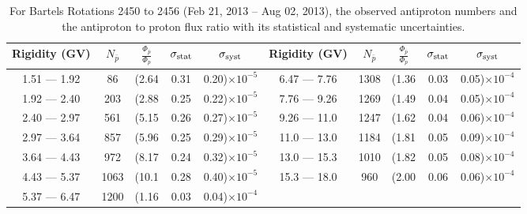 \begin{table}[p] 
\renewcommand\baselinestretch{1.3}\selectfont
\setlength\tabcolsep{3pt}
\centering
\begin{tabular}{ccccc | ccccc}
\hline
\textbf{Rigidity}  (GV)  & $N_{\bar{p}}$ & $\frac{\Phi_{\bar{p}}}{\Phi_{p}}$ & $\sigma_{\rm{stat}}$ & $\sigma_{\rm{syst}}$ \hspace{1cm}   & \textbf{Rigidity}  (GV)  & $N_{\bar{p}}$ & $\frac{\Phi_{\bar{p}}}{\Phi_{p}}$ & $\sigma_{\rm{stat}}$ & $\sigma_{\rm{syst}}$ \hspace{1cm} \\ 
\hline
1.51 — 1.92   &  86                  &(2.64                          &  0.31              &      0.20)$\times 10^{-5}$  & 6.47 — 7.76                &  1308                   &(1.36                                &  0.03                   &      0.05)$\times 10^{-4}$\\
1.92 — 2.40   &  203                &(2.88                          &  0.25              &      0.22)$\times 10^{-5}$  & 7.76 — 9.26                &  1269                    &(1.49                                &  0.04                  &      0.05)$\times 10^{-4}$\\
2.40 — 2.97   &  561                &(5.15                          &  0.26              &      0.27)$\times 10^{-5}$  & 9.26 — 11.0                &  1247                    &(1.62                                &  0.04                   &      0.06)$\times 10^{-4}$\\    
2.97 — 3.64   &  857                &(5.96                          &  0.25              &      0.29)$\times 10^{-5}$  & 11.0 — 13.0                 &  1184                    &(1.81                                &  0.05                   &      0.09)$\times 10^{-4}$\\    
3.64 — 4.43   &  972                &(8.17                          &  0.24              &      0.32)$\times 10^{-5}$  & 13.0 — 15.3               &  1010                    &(1.82                                &  0.05                   &      0.08)$\times 10^{-4}$\\
4.43 — 5.37   &  1063              &(10.1                          &  0.28              &      0.40)$\times 10^{-5}$  & 15.3 — 18.0               &  960                      &(2.00                                &  0.06                   &      0.06)$\times 10^{-4}$\\
5.37 — 6.47   &  1200              &(1.16                          &  0.03              &      0.04)$\times 10^{-4}$  & \\
\hline
\end{tabular}
\caption[Antiproton to proton flux ratio for Bartels Rotations 2450 to 2456]{For Bartels Rotations 2450 to 2456 (Feb 21, 2013 – Aug 02, 2013), the observed antiproton numbers and the antiproton to proton flux ratio with its statistical and systematic uncertainties.}
\label{TableOfDependent5}
\end{table}

